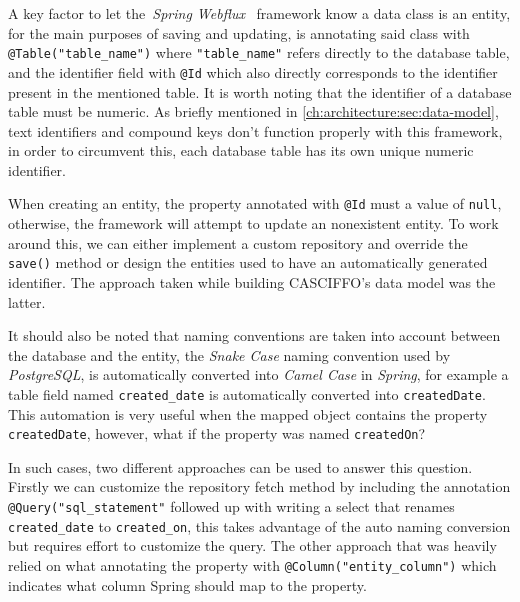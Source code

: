 A key factor to let the~\textit{Spring Webflux}~\cite{spring-webflux} framework know a data class is an entity, for the main purposes of saving and updating, is annotating said class with \lstinline[keywordstyle=\color{black},commentstyle=\color{black},stringstyle=\color{black}]{@Table("table_name")} where \lstinline[keywordstyle=\color{black},commentstyle=\color{black},stringstyle=\color{black}]{"table_name"} refers directly to the database table, and the identifier field with \lstinline{@Id} which also directly corresponds to the identifier present in the mentioned table. It is worth noting that the identifier of a database table must be numeric. As briefly mentioned in \cref{ch:architecture:sec:data-model}, text identifiers and compound keys don't function properly with this framework, in order to circumvent this, each database table has its own unique numeric identifier. 

When creating an entity, the property annotated with \lstinline{@Id} must a value of \lstinline[keywordstyle=\color{black},commentstyle=\color{black},stringstyle=\color{black}]{null}, otherwise, the framework will attempt to update an nonexistent entity. To work around this, we can either implement a custom repository and override the \lstinline{save()} method or design the entities used to have an automatically generated identifier. The approach taken while building CASCIFFO's data model was the latter.

It should also be noted that naming conventions are taken into account between the database and the entity, the \textit{Snake Case} naming convention used by \textit{PostgreSQL}, is automatically converted into \textit{Camel Case} in \textit{Spring}, for example a table field named \lstinline[keywordstyle=\color{black},commentstyle=\color{black},stringstyle=\color{black}]{created_date} is automatically converted into \lstinline{createdDate}. 
This automation is very useful when the mapped object contains the property \lstinline{createdDate}, however, what if the property was named \lstinline{createdOn}?

In such cases, two different approaches can be used to answer this question. Firstly we can customize the repository fetch method by including the annotation \lstinline[keywordstyle=\color{black},commentstyle=\color{black},stringstyle=\color{black}]{@Query("sql_statement"} followed up with writing a select that renames \lstinline[keywordstyle=\color{black},commentstyle=\color{black},stringstyle=\color{black}]{created_date} to \lstinline[keywordstyle=\color{black},commentstyle=\color{black},stringstyle=\color{black}]{created_on}, this takes advantage of the auto naming conversion but requires effort to customize the query. The other approach that was heavily relied on what annotating the property with 
\lstinline[keywordstyle=\color{black},commentstyle=\color{black},stringstyle=\color{black}]{@Column("entity_column")} which indicates what column Spring should map to the property.

